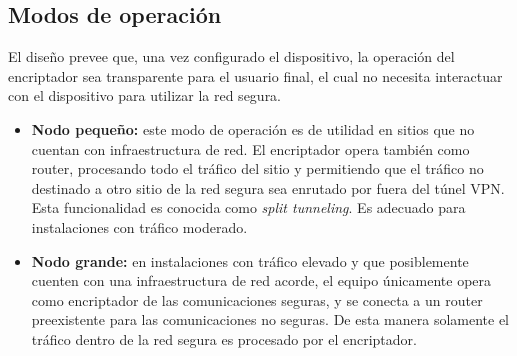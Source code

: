\documentclass[12pt]{article}
\begin{document}
\subsection{Modos de operación}

El diseño prevee que, una vez configurado el dispositivo, la operación del encriptador sea transparente para el usuario final, el cual no necesita interactuar con el dispositivo para utilizar la red segura.
\begin{itemize}
    \item \textbf{Nodo pequeño:} este modo de operación es de utilidad en sitios que no cuentan con infraestructura de red. El encriptador opera también como router, procesando todo el tráfico del sitio y permitiendo que el tráfico no destinado a otro sitio de la red segura sea enrutado por fuera del túnel VPN. Esta funcionalidad es conocida como \textit{split tunneling}. Es adecuado para instalaciones con tráfico moderado.
    \item \textbf{Nodo grande:} en instalaciones con tráfico elevado y que posiblemente cuenten con una infraestructura de red acorde, el equipo únicamente opera como encriptador de las comunicaciones seguras, y se conecta a un router preexistente para las comunicaciones no seguras. De esta manera solamente el tráfico dentro de la red segura es procesado por el encriptador.
\end{itemize}
\end{document}
